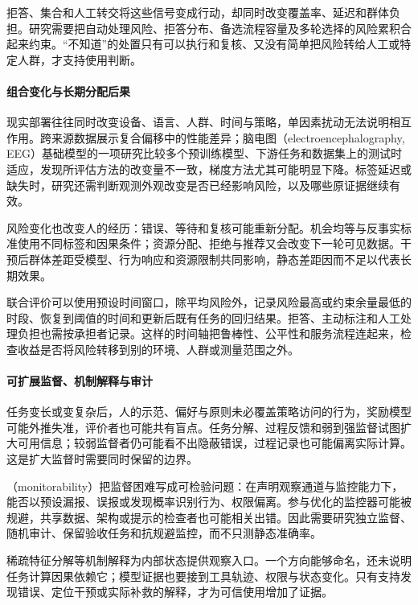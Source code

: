 拒答、集合和人工转交将这些信号变成行动，却同时改变覆盖率、延迟和群体负担。研究需要把自动处理风险、拒答分布、备选流程容量及多轮选择的风险累积合起来约束。“不知道”的处置只有可以执行和复核、又没有简单把风险转给人工或特定人群，才支持使用判断。

\paragraph{组合变化与长期分配后果}

现实部署往往同时改变设备、语言、人群、时间与策略，单因素扰动无法说明相互作用。跨来源数据展示复合偏移中的性能差异；脑电图（electroencephalography, EEG）基础模型的一项研究比较多个预训练模型、下游任务和数据集上的测试时适应，发现所评估方法的改变量不一致，梯度方法尤其可能明显下降。标签延迟或缺失时，研究还需判断观测外观改变是否已经影响风险，以及哪些原证据继续有效。

风险变化也改变人的经历：错误、等待和复核可能重新分配。机会均等与反事实标准使用不同标签和因果条件；资源分配、拒绝与推荐又会改变下一轮可见数据。干预后群体差距受模型、行为响应和资源限制共同影响，静态差距因而不足以代表长期效果。

联合评价可以使用预设时间窗口，除平均风险外，记录风险最高或约束余量最低的时段、恢复到阈值的时间和更新后既有任务的回归结果。拒答、主动标注和人工处理负担也需按承担者记录。这样的时间轴把鲁棒性、公平性和服务流程连起来，检查收益是否将风险转移到别的环境、人群或测量范围之外。

\paragraph{可扩展监督、机制解释与审计}

任务变长或变复杂后，人的示范、偏好与原则未必覆盖策略访问的行为，奖励模型可能外推失准，评价者也可能共有盲点。任务分解、过程反馈和弱到强监督试图扩大可用信息；较弱监督者仍可能看不出隐蔽错误，过程记录也可能偏离实际计算。这是扩大监督时需要同时保留的边界。

（monitorability）把监督困难写成可检验问题：在声明观察通道与监控能力下，能否以预设漏报、误报或发现概率识别行为、权限偏离。参与优化的监控器可能被规避，共享数据、架构或提示的检查者也可能相关出错。因此需要研究独立监督、随机审计、保留验收任务和抗规避监控，而不只测静态准确率。

稀疏特征分解等机制解释为内部状态提供观察入口。一个方向能够命名，还未说明任务计算因果依赖它；模型证据也要接到工具轨迹、权限与状态变化。只有支持发现错误、定位干预或实际补救的解释，才为可信使用增加了证据。

